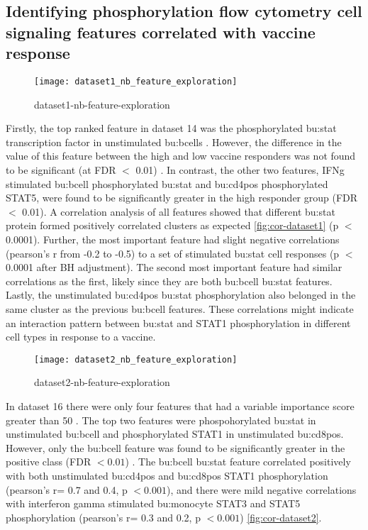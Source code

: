 \subsection{Identifying phosphorylation flow cytometry cell signaling features correlated with vaccine response}

\begin{figure}[htpb]
    \centering
    \texttt{[image: dataset1\_nb\_feature\_exploration]}
    \caption{
        dataset1-nb-feature-exploration
    }\label{fig:dataset1-nb-feature-exploration}
\end{figure}

Firstly, the top ranked feature in dataset 14 was the phosphorylated \gls{bu:stat} transcription factor in unstimulated \gls{bu:bcell}s .
However, the difference in the value of this feature between the high and low vaccine responders was not found to be significant (at FDR $<$ 0.01) .
In contrast, the other two features, IFNg stimulated \gls{bu:bcell} phosphorylated \gls{bu:stat} and \gls{bu:cd4pos} phosphorylated STAT5, were found to be significantly greater in the high responder group (FDR $<$ 0.01).
A correlation analysis of all features showed that different \gls{bu:stat} protein formed positively correlated clusters as expected \autoref{fig:cor-dataset1} (p \(<\) 0.0001).
Further, the most important feature had slight negative correlations (pearson's r from -0.2 to -0.5) to a set of stimulated \gls{bu:stat} cell responses (p \(<\) 0.0001 after BH adjustment).
The second most important feature had similar correlations as the first, likely since they are both \gls{bu:bcell} \gls{bu:stat} features.
Lastly, the unstimulated \gls{bu:cd4pos} \gls{bu:stat} phosphorylation also belonged in the same cluster as the previous \gls{bu:bcell} features.
These correlations might indicate an interaction pattern between \gls{bu:stat} and STAT1 phosphorylation in different cell types in response to a vaccine.

\begin{figure}[htpb]
    \centering
    \texttt{[image: dataset2\_nb\_feature\_exploration]}
    \caption{
        dataset2-nb-feature-exploration
    }\label{fig:dataset2-nb-feature-exploration}
\end{figure}

In dataset 16 there were only four features that had a variable importance score greater than 50 .
The top two features were phospohorylated \gls{bu:stat} in unstimulated \gls{bu:bcell} and phosphorylated STAT1 in unstimulated \gls{bu:cd8pos}.
However, only the \gls{bu:bcell} feature was found to be significantly greater in the positive class (FDR \(< 0.01\)) .
The \gls{bu:bcell} \gls{bu:stat} feature correlated positively with both unstimulated \gls{bu:cd4pos} and \gls{bu:cd8pos} STAT1 phosphorylation (pearson's r= 0.7 and 0.4, p \(< 0.001\)), and there were mild negative correlations with interferon gamma stimulated \gls{bu:monocyte} STAT3 and STAT5 phosphorylation (pearson's r= 0.3 and 0.2, p \(< 0.001\)) \autoref{fig:cor-dataset2}.

